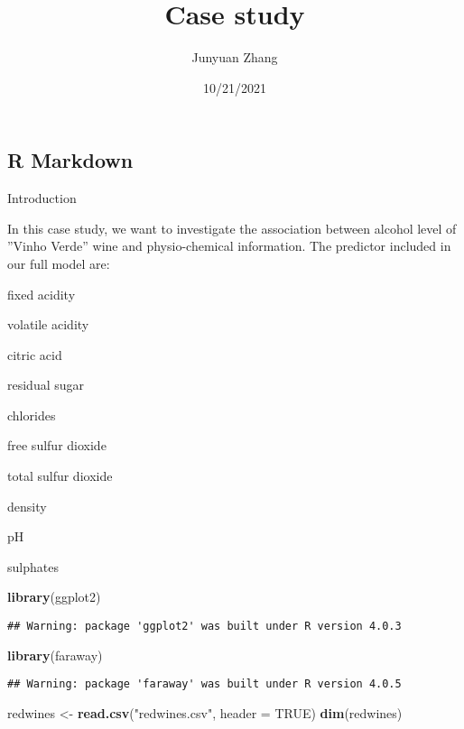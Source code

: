 \documentclass[
]{article}
\title{Case study}
\author{Junyuan Zhang}
\date{10/21/2021}
\newenvironment{Shaded}{\begin{snugshade}}{\end{snugshade}}
\newcommand{\DataTypeTok}[1]{\textcolor[rgb]{0.13,0.29,0.53}{#1}}
\newcommand{\KeywordTok}[1]{\textcolor[rgb]{0.13,0.29,0.53}{\textbf{#1}}}
\newcommand{\NormalTok}[1]{#1}
\newcommand{\OtherTok}[1]{\textcolor[rgb]{0.56,0.35,0.01}{#1}}
\newcommand{\StringTok}[1]{\textcolor[rgb]{0.31,0.60,0.02}{#1}}
\begin{document}
\maketitle

\hypertarget{r-markdown}{%
\subsection{R Markdown}\label{r-markdown}}

Introduction

In this case study, we want to investigate the association between
alcohol level of ''Vinho Verde'' wine and physio-chemical information.
The predictor included in our full model are:

fixed acidity

volatile acidity

citric acid

residual sugar

chlorides

free sulfur dioxide

total sulfur dioxide

density

pH

sulphates

\begin{Shaded}
\begin{Highlighting}[]
\KeywordTok{library}\NormalTok{(ggplot2)}
\end{Highlighting}
\end{Shaded}

\begin{verbatim}
## Warning: package 'ggplot2' was built under R version 4.0.3
\end{verbatim}

\begin{Shaded}
\begin{Highlighting}[]
\KeywordTok{library}\NormalTok{(faraway)}
\end{Highlighting}
\end{Shaded}

\begin{verbatim}
## Warning: package 'faraway' was built under R version 4.0.5
\end{verbatim}

\begin{Shaded}
\begin{Highlighting}[]
\NormalTok{redwines <-}\StringTok{ }\KeywordTok{read.csv}\NormalTok{(}\StringTok{"redwines.csv"}\NormalTok{, }\DataTypeTok{header =} \OtherTok{TRUE}\NormalTok{)}
\KeywordTok{dim}\NormalTok{(redwines)}
\end{Highlighting}
\end{Shaded}
\end{document}
